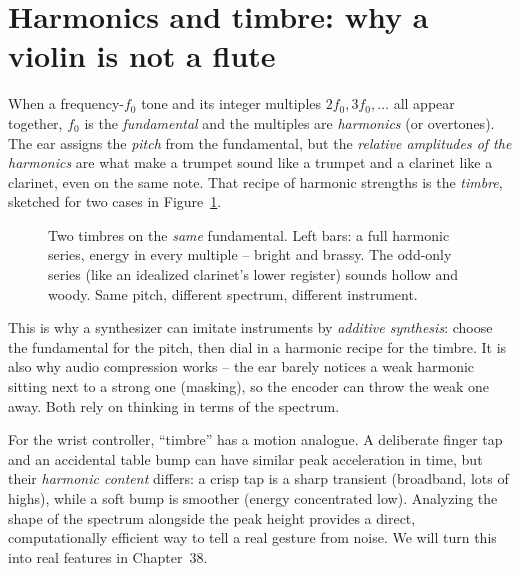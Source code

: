\section{Harmonics and timbre: why a violin is not a flute}
When a frequency-$f_0$ tone and its integer multiples $2f_0, 3f_0, \dots$ all
appear together, $f_0$ is the \emph{fundamental} and the multiples are
\emph{harmonics} (or overtones). The ear assigns the \emph{pitch} from the
fundamental, but the \emph{relative amplitudes of the harmonics} are what make a
trumpet sound like a trumpet and a clarinet like a clarinet, even on the same note.
That recipe of harmonic strengths is the \emph{timbre}, sketched for two cases in
Figure~\ref{ch05:timbre}.
\begin{figure}[H]
\centering
{}
\caption{Two timbres on the \emph{same} fundamental. Left bars: a full harmonic
series, energy in every multiple -- bright and brassy. The odd-only series (like an
idealized clarinet's lower register) sounds hollow and woody. Same pitch, different
spectrum, different instrument.}
\label{ch05:timbre}
\end{figure}

\begin{applicationbox}
This is why a synthesizer can imitate instruments by \emph{additive synthesis}:
choose the fundamental for the pitch, then dial in a harmonic recipe for the timbre.
It is also why audio compression works -- the ear barely notices a weak harmonic
sitting next to a strong one (masking), so the encoder can throw the weak one away.
Both rely on thinking in terms of the spectrum.
\end{applicationbox}

\begin{goalbox}
For the wrist controller, ``timbre'' has a motion analogue. A deliberate finger tap
and an accidental table bump can have similar peak acceleration in time, but their
\emph{harmonic content} differs: a crisp tap is a sharp transient (broadband, lots
of highs), while a soft bump is smoother (energy concentrated low). Analyzing the
shape of the spectrum alongside the peak height provides a direct, computationally efficient way to
tell a real gesture from noise. We will turn this into real features in
Chapter~38.
\end{goalbox}

